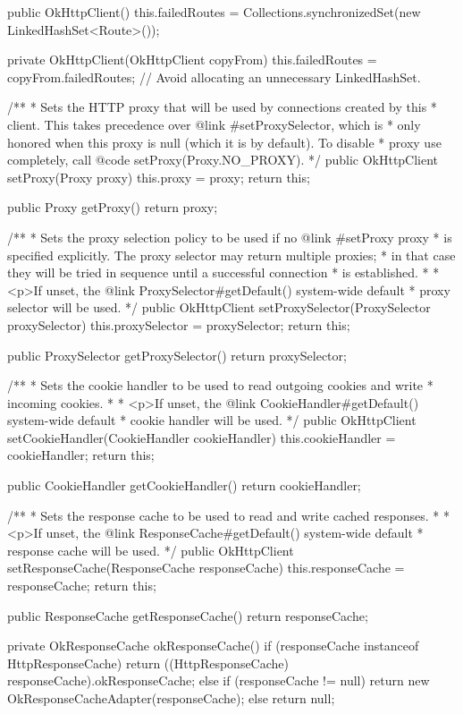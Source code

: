\begin{prompt}
{{{{{{{{  public OkHttpClient() {
    this.failedRoutes = Collections.synchronizedSet(new LinkedHashSet<Route>());
  }

  private OkHttpClient(OkHttpClient copyFrom) {
    this.failedRoutes = copyFrom.failedRoutes; // Avoid allocating an unnecessary LinkedHashSet.
  }

  /**
   * Sets the HTTP proxy that will be used by connections created by this
   * client. This takes precedence over {@link #setProxySelector}, which is
   * only honored when this proxy is null (which it is by default). To disable
   * proxy use completely, call {@code setProxy(Proxy.NO_PROXY)}.
   */
  public OkHttpClient setProxy(Proxy proxy) {
    this.proxy = proxy;
    return this;
  }

  public Proxy getProxy() {
    return proxy;
  }

  /**
   * Sets the proxy selection policy to be used if no {@link #setProxy proxy}
   * is specified explicitly. The proxy selector may return multiple proxies;
   * in that case they will be tried in sequence until a successful connection
   * is established.
   *
   * <p>If unset, the {@link ProxySelector#getDefault() system-wide default}
   * proxy selector will be used.
   */
  public OkHttpClient setProxySelector(ProxySelector proxySelector) {
    this.proxySelector = proxySelector;
    return this;
  }

  public ProxySelector getProxySelector() {
    return proxySelector;
  }

  /**
   * Sets the cookie handler to be used to read outgoing cookies and write
   * incoming cookies.
   *
   * <p>If unset, the {@link CookieHandler#getDefault() system-wide default}
   * cookie handler will be used.
   */
  public OkHttpClient setCookieHandler(CookieHandler cookieHandler) {
    this.cookieHandler = cookieHandler;
    return this;
  }

  public CookieHandler getCookieHandler() {
    return cookieHandler;
  }

  /**
   * Sets the response cache to be used to read and write cached responses.
   *
   * <p>If unset, the {@link ResponseCache#getDefault() system-wide default}
   * response cache will be used.
   */
  public OkHttpClient setResponseCache(ResponseCache responseCache) {
    this.responseCache = responseCache;
    return this;
  }

  public ResponseCache getResponseCache() {
    return responseCache;
  }

  private OkResponseCache okResponseCache() {
    if (responseCache instanceof HttpResponseCache) {
      return ((HttpResponseCache) responseCache).okResponseCache;
    } else if (responseCache != null) {
      return new OkResponseCacheAdapter(responseCache);
    } else {
      return null;
    }
  }

}}}}}}}}
\end{prompt}
